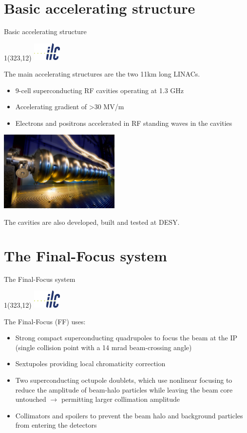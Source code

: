 \documentclass[xcolor={dvipsnames}]{beamer}
\newcommand{\ilclogo}{
  \setlength{\TPHorizModule}{1pt}
  \setlength{\TPVertModule}{1pt}
  \begin{textblock}{1}(323,12)
   \includegraphics[width=40pt,height=26pt]{figures/ILC.jpeg}
  \end{textblock}
}
\begin{document}
\section{Basic accelerating structure}
\begin{frame}{Basic accelerating structure}
\ilclogo
The main accelerating structures are the two 11km long LINACs.
\begin{itemize}
\item 9-cell superconducting RF cavities operating at 1.3 GHz 
\item Accelerating gradient of >30 MV/m
\item Electrons and positrons accelerated in RF standing waves in the cavities 
\end{itemize}
\begin{center}
\includegraphics[width=0.45\textwidth]{figures/cavity.jpg}
\end{center}
The cavities are also developed, built and tested at DESY.
\end{frame}

\section{The Final-Focus system}
\begin{frame}{The Final-Focus system}
 \ilclogo
 The Final-Focus (FF) uses:
\begin{itemize}
 \item Strong compact superconducting quadrupoles to focus the
beam at the IP (single collision point with a 14 mrad beam-crossing angle)
\item Sextupoles providing local chromaticity correction
\item Two superconducting octupole doublets, which use nonlinear
focusing to reduce the amplitude of beam-halo particles while leaving the beam core untouched $\rightarrow$ permitting larger collimation amplitude
\item Collimators and spoilers to prevent the beam halo and background particles from entering the detectors
\end{itemize}

\end{frame}
\end{document}
